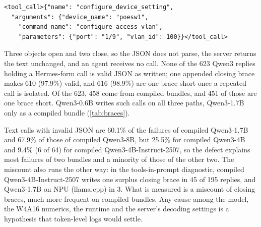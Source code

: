 \documentclass[11pt]{article}
\begin{document}
\begin{small}
\begin{verbatim}
<tool_call>{"name": "configure_device_setting",
  "arguments": {"device_name": "poesw1",
    "command_name": "configure_access_vlan",
    "parameters": {"port": "1/9", "vlan_id": 100}}</tool_call>
\end{verbatim}
\end{small}

Three objects open and two close, so the JSON does not parse, the server returns the text unchanged, and an agent receives no call. None of the 623 Qwen3 replies holding a Hermes-form call is valid JSON as written; one appended closing brace makes 610 (97.9\%) valid, and 616 (98.9\%) are one brace short once a repeated call is isolated. Of the 623, 458 come from compiled bundles, and 451 of those are one brace short. Qwen3-0.6B writes such calls on all three paths, Qwen3-1.7B only as a compiled bundle (\cref{tab:braces}).

Text calls with invalid JSON are 60.1\% of the failures of compiled Qwen3-1.7B and 67.9\% of those of compiled Qwen3-8B, but 25.5\% for compiled Qwen3-4B and 9.4\% (6 of 64) for compiled Qwen3-4B-Instruct-2507, so the defect explains most failures of two bundles and a minority of those of the other two. The miscount also runs the other way: in the tools-in-prompt diagnostic, compiled Qwen3-4B-Instruct-2507 writes one surplus closing brace in 45 of 195 replies, and Qwen3-1.7B on NPU (llama.cpp) in 3. What is measured is a miscount of closing braces, much more frequent on compiled bundles. Any cause among the model, the W4A16 numerics, the runtime and the server's decoding settings is a hypothesis that token-level logs would settle.
\end{document}

